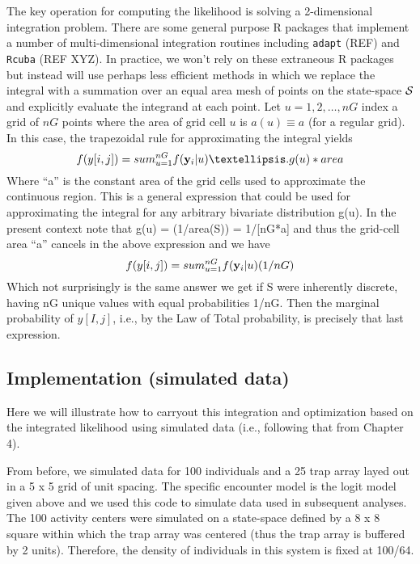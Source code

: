The key operation for computing the likelihood is solving a
2-dimensional integration problem. There are some general purpose R
packages that implement a number of 
 multi-dimensional integration routines
including \mbox{\tt adapt} (REF) and \mbox{\tt Rcuba} (REF XYZ). In practice, we won’t rely
on these extraneous R packages but instead will use perhaps less
efficient methods in which we replace the integral with a summation
over an equal area mesh of points on the state-space ${\cal S}$ and explicitly
evaluate the integrand at each point. Let $u=1,2,\ldots,nG$ index a grid of
$nG$ points where the area of grid cell $u$ is $a(u) \equiv a$ (for a regular grid).
In this case, the trapezoidal rule
for approximating the integral yields
\[
          f(y[i,j]) = sum_{u=1}^{nG}  f( {\bold y}_{i} |u) …. g(u) *area
\]
Where “a” is the constant area of the grid cells used to approximate
the continuous region. This is a general expression that could be used
for approximating the integral for any arbitrary bivariate
distribution g(u). In the present context note that g(u) = (1/area(S))
= 1/[nG*a] and thus the grid-cell area “a” cancels in the above
expression and we have
\[
          f(y[i,j]) = sum_{u=1}^{nG}  f( {\bold y}_{i} |u) (1/nG)
\]
Which not surprisingly is the same answer we get if S were inherently
discrete, having nG unique values with equal probabilities 1/nG. Then
the marginal probability of $y[I,j]$, i.e., by the Law of Total
probability, is precisely that last expression.

\subsection{ Implementation (simulated data)}

Here we will illustrate how to carryout this integration and
optimization based on the integrated likelihood using simulated data
 (i.e., following that from Chapter 4).

From before, we simulated data for 100 individuals and a 25 trap array
layed out in a 5 x 5 grid of unit spacing.  The specific encounter
model is the logit model given above and we used this code to simulate
data used in subsequent analyses.  The 100 activity centers were
simulated on a state-space defined by a 8 x 8 square within which the
trap array was centered (thus the trap array is buffered by 2
units). Therefore, the density of individuals in this system is fixed
at 100/64.

